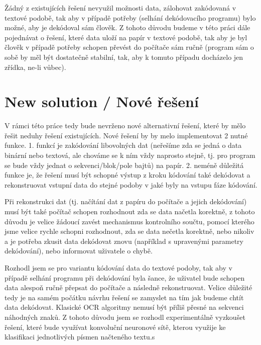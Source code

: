 \documentclass[conference]{IEEEtran}
\begin{document}
Žádný z existujících řešení nevyužil možnosti data, zálohovat zakódovaná v textové podobě, tak aby v případě potřeby (selhání dekódovacího programu) bylo možné, aby je dekódoval sám člověk. Z tohoto důvodu budeme v této práci dále pojednávat o řešení, které data uloží na papír v textové podobě, tak aby je byl člověk v případě potřeby schopen převést do počítače sám ručně (program sám o sobě by měl být dostatečně stabilní, tak, aby k tomuto případu docházelo jen zřídka, ne-li vůbec). 

\section{New solution / Nové řešení}

V rámci této práce tedy bude nevrženo nové alternativní řešení, které by mělo řešit neduhy řešení existujících. Nové řešení by by melo implementovat 2 nutné funkce. 1. funkcí je zakódování libovolných dat (neřešíme zda se jedná o data binární nebo textová, ale chováme se k ním vždy naprosto stejně, tj. pro program se bude vždy jednat o sekvenci/blok/pole bajtů) na papír. 2. neméně důležitá funkce je, že řešení musí být schopné výstup z kroku kódování také dekódovat a rekonstruovat vstupní data do stejné podoby v jaké byly na vstupu fáze kódování. 

Při rekonstrukci dat (tj. načítání dat z papíru do počítače a jejich dekódování) musí být také počítač schopen rozhodnout zda se data načetla korektně, z tohoto důvodu je velice žádoucí zavést mechanismus kontrolního součtu, pomocí kterého jsme velice rychle schopni rozhodnout, zda se data nečetla korektně, nebo nikoliv a je potřeba zkusit data dekódovat znovu (například s upravenými parametry dekódování), nebo informovat uživatele o chybě.

Rozhodl jsem se pro variantu kódování data do textové podoby, tak aby v případě selhání programu při dekódování byla šance, že uživatel bude schopen data alespoň ručně přepsat do počítače a následně rekonstruovat. Velice důležité tedy je na samém počátku návrhu řešení se zamyslet na tím jak budeme chtít data dekódovat. Klasické OCR algoritmy nemusí být příliš přesné na sekvenci náhodných znaků. Z tohoto důvodu jsem se rozhodl experimentálně vyzkoušet řešení, které bude využívat konvoluční neuronové sítě, kterou využije ke klasifikaci jednotlivých písmen načteného textu.s
\end{document}
